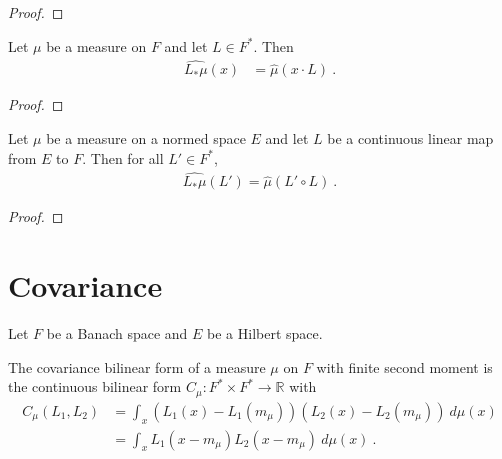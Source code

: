 \begin{proof}
\end{proof}


\begin{lemma}\label{lem:charFun_map_eq_charFunDual_smul}
  \mathlibok
Let $\mu$ be a measure on $F$ and let $L \in F^*$. Then
\begin{align*}
  \widehat{L_*\mu}(x) &= \hat{\mu}(x \cdot L) \: .
\end{align*}
\end{lemma}

\begin{proof}
\end{proof}


\begin{lemma}\label{lem:charFunDual_map}
  \mathlibok
Let $\mu$ be a measure on a normed space $E$ and let $L$ be a continuous linear map from $E$ to $F$.
Then for all $L' \in F^*$,
\begin{align*}
  \widehat{L_*\mu}(L') = \hat{\mu}(L' \circ L) \: .
\end{align*}
\end{lemma}

\begin{proof}
\end{proof}



\section{Covariance}
\label{sec:covariance}

Let $F$ be a Banach space and $E$ be a Hilbert space.

\begin{definition}[Covariance]\label{def:covarianceBilin}
  \mathlibok
The covariance bilinear form of a measure $\mu$ on $F$ with finite second moment is the continuous bilinear form $C_\mu : F^* \times F^* \to \mathbb{R}$ with
\begin{align*}
  C_\mu(L_1, L_2)
  &= \int_x (L_1(x) - L_1(m_\mu)) (L_2(x) - L_2(m_\mu)) \: d\mu(x)
  \\
  &= \int_x L_1(x - m_\mu) L_2(x- m_\mu) \: d\mu(x)
  \: .
\end{align*}
\end{definition}

